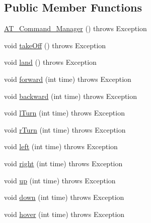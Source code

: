 \subsection*{Public Member Functions}
\begin{DoxyCompactItemize}
\item 
\hyperlink{class_drone_1_1_drone_commands_1_1_a_t___command___manager_afcbb9940f1139a33dcd91cc906017c67}{A\+T\+\_\+\+Command\+\_\+\+Manager} ()  throws Exception 	
\item 
void \hyperlink{class_drone_1_1_drone_commands_1_1_a_t___command___manager_a3e7b081b93ed1f6340ea1868a58328ac}{take\+Off} ()  throws Exception 	
\item 
void \hyperlink{class_drone_1_1_drone_commands_1_1_a_t___command___manager_adc6326783865ffcf17fccfe593e473ab}{land} ()  throws Exception 	
\item 
void \hyperlink{class_drone_1_1_drone_commands_1_1_a_t___command___manager_aff74ba72cc5ad2c2a0be2e379dfb2999}{forward} (int time)  throws Exception 	
\item 
void \hyperlink{class_drone_1_1_drone_commands_1_1_a_t___command___manager_a31382c4970d43aedd7000fee43800121}{backward} (int time)  throws Exception 	
\item 
void \hyperlink{class_drone_1_1_drone_commands_1_1_a_t___command___manager_a378e3dccef0b323a01c710976aade5ff}{l\+Turn} (int time)  throws Exception 	
\item 
void \hyperlink{class_drone_1_1_drone_commands_1_1_a_t___command___manager_a9fece47a3c278e30af61ba874be520ce}{r\+Turn} (int time)  throws Exception 	
\item 
void \hyperlink{class_drone_1_1_drone_commands_1_1_a_t___command___manager_a2253a733deef7cc146b77f5cf721e520}{left} (int time)  throws Exception 	
\item 
void \hyperlink{class_drone_1_1_drone_commands_1_1_a_t___command___manager_a6e56940306a5cb6d8833d4920d4a6625}{right} (int time)  throws Exception 	
\item 
void \hyperlink{class_drone_1_1_drone_commands_1_1_a_t___command___manager_a4c5e3deb10626fd443c37b83b944bea4}{up} (int time)  throws Exception 	
\item 
void \hyperlink{class_drone_1_1_drone_commands_1_1_a_t___command___manager_aac0d7629bb414d4043d626746c5a92ee}{down} (int time)  throws Exception 	
\item 
void \hyperlink{class_drone_1_1_drone_commands_1_1_a_t___command___manager_abcd19295e17d6e48da7a216bce99cddc}{hover} (int time)  throws Exception 	
\end{DoxyCompactItemize}
